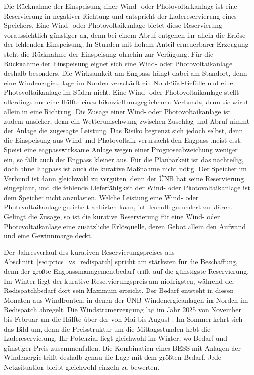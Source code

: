 Die Rücknahme der Einspeisung einer Wind- oder Photovoltaikanlage ist eine Reservierung in negativer Richtung und entspricht der Ladereservierung eines Speichers.
Eine Wind- oder Photovoltaikanlage bietet diese Reservierung voraussichtlich günstiger an, denn bei einem Abruf entgehen ihr allein die Erlöse der fehlenden Einspeisung.
In Stunden mit hohem Anteil erneuerbarer Erzeugung steht die Rücknahme der Einspeisung ohnehin zur Verfügung.
Für die Rücknahme der Einspeisung eignet sich eine Wind- oder Photovoltaikanlage deshalb besonders.
Die Wirksamkeit am Engpass hängt dabei am Standort, denn eine Windenergieanlage im Norden verschärft ein Nord-Süd-Gefälle und eine Photovoltaikanlage im Süden nicht.
Eine Wind- oder Photovoltaikanlage stellt allerdings nur eine Hälfte eines bilanziell ausgeglichenen Verbunds, denn sie wirkt allein in eine Richtung.
Die Zusage einer Wind- oder Photovoltaikanlage ist zudem unsicher, denn ein Wetterumschwung zwischen Zuschlag und Abruf nimmt der Anlage die zugesagte Leistung.
Das Risiko begrenzt sich jedoch selbst, denn die Einspeisung aus Wind und Photovoltaik verursacht den Engpass meist erst.
Speist eine engpasswirksame Anlage wegen einer Prognoseabweichung weniger ein, so fällt auch der Engpass kleiner aus.
Für die Planbarkeit ist das nachteilig, doch ohne Engpass ist auch die kurative Maßnahme nicht nötig.
Der Speicher im Verbund ist dann gleichwohl zu vergüten, denn der \ac{ÜNB} hat seine Reservierung eingeplant, und die fehlende Lieferfähigkeit der Wind- oder Photovoltaikanlage ist dem Speicher nicht anzulasten.
Welche Leistung eine Wind- oder Photovoltaikanlage gesichert anbieten kann, ist deshalb gesondert zu klären.
Gelingt die Zusage, so ist die kurative Reservierung für eine Wind- oder Photovoltaikanlage eine zusätzliche Erlösquelle, deren Gebot allein den Aufwand und eine Gewinnmarge deckt.

Der Jahresverlauf des kurativen Reservierungspreises aus Abschnitt~\ref{sec:price_vs_redispatch} spricht am stärksten für die Beschaffung, denn der größte Engpassmanagementbedarf trifft auf die günstigste Reservierung.
Im Winter liegt der kurative Reservierungspreis am niedrigsten, während der Redispatchbedarf dort sein Maximum erreicht.
Der Bedarf entsteht in diesen Monaten aus Windfronten, in denen der \ac{ÜNB} Windenergieanlagen im Norden im Redispatch abregelt.
Die Windstromerzeugung lag im Jahr 2025 von November bis Februar um die Hälfte über der von Mai bis August \cite{burger_stromerzeugung_2026}.
Im Sommer kehrt sich das Bild um, denn die Preisstruktur um die Mittagsstunden hebt die Ladereservierung.
Ihr Potenzial liegt gleichwohl im Winter, wo Bedarf und günstiger Preis zusammenfallen.
Die Kombination eines \ac{BESS} mit Anlagen der Windenergie trifft deshalb genau die Lage mit dem größten Bedarf.
Jede Netzsituation bleibt gleichwohl einzeln zu bewerten.

